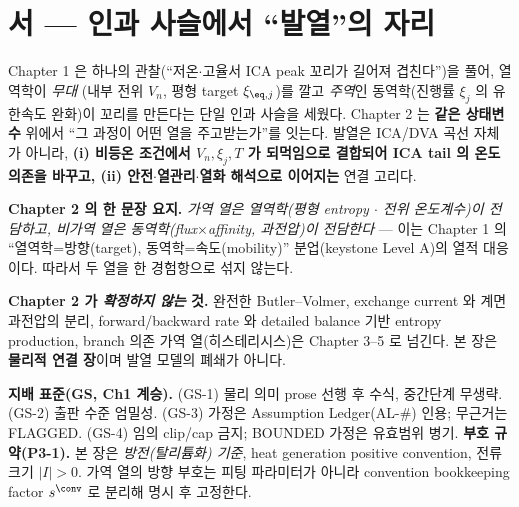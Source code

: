 
\section*{서 — 인과 사슬에서 ``발열''의 자리}
Chapter 1 은 하나의 관찰(``저온$\cdot$고율서 ICA peak 꼬리가 길어져 겹친다'')을 풀어, 열역학이 \emph{무대}
(내부 전위 $V_n$, 평형 target $\xi_{\eq,j}$)를 깔고 \emph{주역}인 동역학(진행률 $\xi_j$ 의 유한속도 완화)이
꼬리를 만든다는 단일 인과 사슬을 세웠다. Chapter 2 는 \textbf{같은 상태변수} 위에서 ``그 과정이 어떤 열을
주고받는가''를 잇는다. 발열은 ICA/DVA 곡선 자체가 아니라, \textbf{(i) 비등온 조건에서 $V_n,\xi_j,T$ 가
되먹임으로 결합되어 ICA tail 의 온도 의존을 바꾸고, (ii) 안전$\cdot$열관리$\cdot$열화 해석으로 이어지는}
연결 고리다.

\textbf{Chapter 2 의 한 문장 요지.} \emph{가역 열은 열역학(평형 entropy $\cdot$ 전위 온도계수)이 전담하고,
비가역 열은 동역학(flux$\times$affinity, 과전압)이 전담한다} — 이는 Chapter 1 의 ``열역학=방향(target),
동역학=속도(mobility)'' 분업(keystone Level A)의 열적 대응이다. 따라서 두 열을 한 경험항으로 섞지 않는다.

\textbf{Chapter 2 가 \emph{확정하지 않는} 것.} 완전한 Butler--Volmer, exchange current 와 계면 과전압의
분리, forward/backward rate 와 detailed balance 기반 entropy production, branch 의존 가역 열(히스테리시스)은
Chapter 3--5 로 넘긴다. 본 장은 \textbf{물리적 연결 장}이며 발열 모델의 폐쇄가 아니다.

\begin{groundingbox}
\textbf{지배 표준(GS, Ch1 계승).} (GS-1) 물리 의미 prose 선행 후 수식, 중간단계 무생략. (GS-2) 출판 수준
엄밀성. (GS-3) 가정은 Assumption Ledger(AL-\#) 인용; 무근거는 FLAGGED. (GS-4) 임의 clip/cap 금지;
BOUNDED 가정은 유효범위 병기. \textbf{부호 규약(P3-1).} 본 장은 \emph{방전(탈리튬화) 기준}, heat generation
positive convention, 전류 크기 $|I|>0$. 가역 열의 방향 부호는 피팅 파라미터가 아니라 convention
bookkeeping factor $s^{\conv}$ 로 분리해 명시 후 고정한다.
\end{groundingbox}


